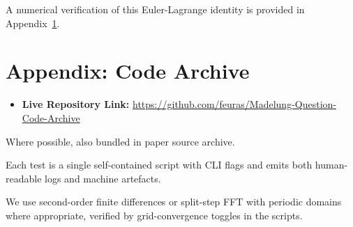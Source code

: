 \documentclass[11pt,a4paper]{article}
\numberwithin{equation}{section}
\theoremstyle{thmcompact}
\theoremstyle{remark}
\begin{document}
A numerical verification of this Euler-Lagrange identity is provided in Appendix~\ref{app:code-repo}.

	
	\section{Appendix: Code Archive}
	
	\label{app:code-repo}
	
	\begin{itemize}
		\item \textbf{Live Repository Link:} 
		\href{https://github.com/feuras/Madelung-Question-Code-Archive}{https://github.com/feuras/Madelung-Question-Code-Archive}
	\end{itemize}
	
	Where possible, also bundled in paper source archive.
	
	Each test is a single self-contained script with CLI flags and emits both human-readable logs and machine artefacts. 
	
	We use second-order finite differences or split-step FFT with periodic domains where appropriate, verified by grid-convergence toggles in the scripts.
	
\end{document}
